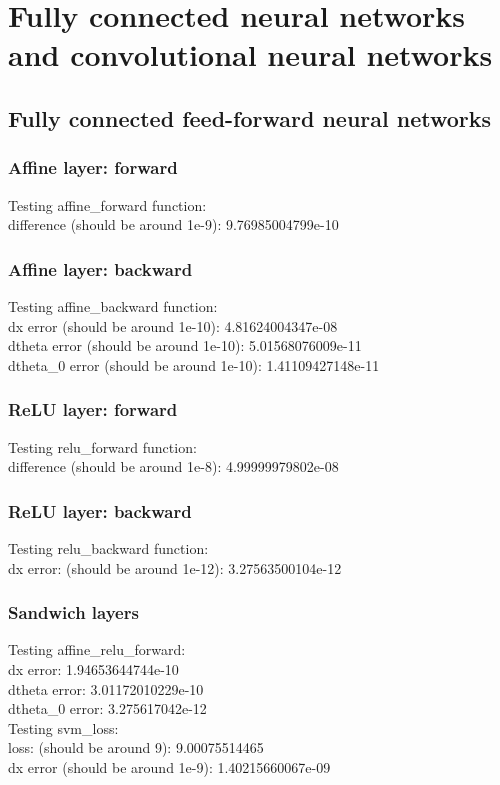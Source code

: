 \documentclass{article}
\begin{document}
\newpage

\section{Fully connected neural networks and convolutional neural networks}

\subsection{Fully connected feed-forward neural networks}

\subsubsection{Affine layer: forward}
{\footnotesize 
Testing affine\_forward function:\\
difference (should be around 1e-9):  9.76985004799e-10\\
}


\subsubsection{Affine layer: backward}
{\footnotesize
Testing affine\_backward function:\\
dx error (should be around 1e-10):  4.81624004347e-08\\
dtheta error (should be around 1e-10):  5.01568076009e-11\\
dtheta\_0 error (should be around 1e-10):  1.41109427148e-11\\
}

\subsubsection{ReLU layer: forward}
{\footnotesize
Testing relu\_forward function:\\
difference (should be around 1e-8):  4.99999979802e-08\\
}

\subsubsection{ReLU layer: backward}
{\footnotesize
Testing relu\_backward function:\\
dx error: (should be around 1e-12):  3.27563500104e-12\\
}


\subsubsection*{Sandwich layers}
{\footnotesize
Testing affine\_relu\_forward:\\
dx error:  1.94653644744e-10\\
dtheta error:  3.01172010229e-10\\
dtheta\_0 error:  3.275617042e-12\\

Testing svm\_loss:\\
loss: (should be around 9):  9.00075514465\\
dx error (should be around 1e-9):  1.40215660067e-09\\
}
\end{document}
